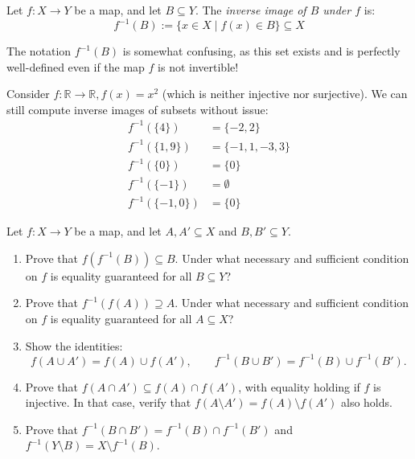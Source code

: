 \begin{definition}
\label{def:inverse_image_of_subset}
Let $f: X \to Y$ be a map, and let $B \subseteq Y$. The \textit{inverse image of $B$ under $f$} is:
\[
f^{-1}(B) := \{x \in X \mid f(x) \in B\} \subseteq X
\]
\end{definition}

\begin{importantremark}
The notation $f^{-1}(B)$ is somewhat confusing, as this set exists and is perfectly well-defined even if the map $f$ is not invertible!
\end{importantremark}

\begin{example}
Consider $f: \mathbb{R} \to \mathbb{R}, f(x) = x^2$ (which is neither injective nor surjective). We can still compute inverse images of subsets without issue:
\begin{align*}
f^{-1}(\{4\}) &= \{-2, 2\} \\
f^{-1}(\{1, 9\}) &= \{-1, 1, -3, 3\} \\
f^{-1}(\{0\}) &= \{0\} \\
f^{-1}(\{-1\}) &= \emptyset \\
f^{-1}(\{-1, 0\}) &= \{0\}
\end{align*}
\end{example}

\begin{exercise}
\label{exc:images_preimages_operations}
Let $f \colon X \to Y$ be a map, and let $A, A' \subseteq X$ and $B, B' \subseteq Y$.
\begin{enumerate}
    \item Prove that $f(f^{-1}(B)) \subseteq B$. Under what necessary and sufficient condition on $f$ is equality guaranteed for all $B \subseteq Y$?
    \item Prove that $f^{-1}(f(A)) \supseteq A$. Under what necessary and sufficient condition on $f$ is equality guaranteed for all $A \subseteq X$?
    \item Show the identities:
    \[
    f(A \cup A') = f(A) \cup f(A'), \qquad f^{-1}(B \cup B') = f^{-1}(B) \cup f^{-1}(B').
    \]
    \item Prove that $f(A \cap A') \subseteq f(A) \cap f(A')$, with equality holding if $f$ is injective. In that case, verify that $f(A \setminus A') = f(A) \setminus f(A')$ also holds.
    \item Prove that $f^{-1}(B \cap B') = f^{-1}(B) \cap f^{-1}(B')$ and $f^{-1}(Y \setminus B) = X \setminus f^{-1}(B)$.
\end{enumerate}
\end{exercise}

